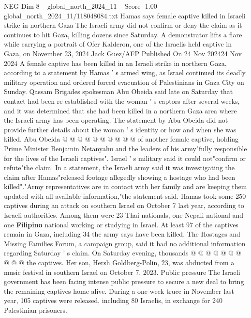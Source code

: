 \begin{textsample}{NEG Dim 8 – global\_north\_2024\_11 – Score -1.00 – global\_north\_2024\_11/118048084.txt}  \label{ex:f8_neg_390}
Hamas says female captive killed in Israeli strike in northern Gaza The Israeli army did not confirm or deny the claim as it continues to hit Gaza, killing dozens since Saturday.
A demonstrator lifts a flare while carrying a portrait of Ofer Kalderon, one of the Israelis held captive in Gaza, on November 23, 2024 Jack Guez/AFP Published On 24 Nov 202424 Nov 2024 A female captive has been killed in an Israeli strike in northern Gaza, according to a statement by Hamas ' s armed wing, as Israel continued its deadly military operation and ordered forced evacuation of Palestinians in Gaza City on Sunday.
Qassam Brigades spokesman Abu Obeida said late on Saturday that contact had been re-established with the woman ' s captors after several weeks, and it was determined that she had been killed in a northern Gaza area where the Israeli army has been operating.
The statement by Abu Obeida did not provide further details about the woman ' s identity or how and when she was killed.
Abu Obeida @ @ @ @ @ @ @ @ @ @ of another female captive, holding Prime Minister Benjamin Netanyahu and the leaders of his army"fully responsible for the lives of the Israeli captives".
Israel ' s military said it could not"confirm or refute"the claim.
In a statement, the Israeli army said it was investigating the claim after Hamas"released footage allegedly showing a hostage who had been killed"."Army representatives are in contact with her family and are keeping them updated with all available information,"the statement said.
Hamas took some 250 captives during an attack on southern Israel on October 7 last year, according to Israeli authorities.
Among them were 23 Thai nationals, one Nepali national and one \textbf{Filipino} national working or studying in Israel.
At least 97 of the captives remain in Gaza, including 34 the army says have been killed.
The Hostages and Missing Families Forum, a campaign group, said it had no additional information regarding Saturday ' s claim.
On Saturday evening, thousands @ @ @ @ @ @ @ @ @ @ the captives.
Her son, Hersh Goldberg-Polin, 23, was abducted from a music festival in southern Israel on October 7, 2023.
Public pressure The Israeli government has been facing intense public pressure to secure a new deal to bring the remaining captives home alive.
During a one-week truce in November last year, 105 captives were released, including 80 Israelis, in exchange for 240 Palestinian prisoners.

\end{textsample}
